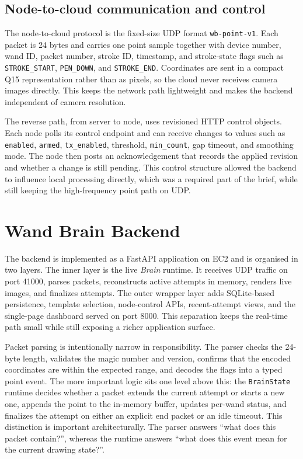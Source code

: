 \documentclass[10pt,a4paper]{article}
\begin{document}
\subsection*{Node-to-cloud communication and control}

The node-to-cloud protocol is the fixed-size UDP format
\texttt{wb-point-v1}. Each packet is 24 bytes and carries one point sample
together with device number, wand ID, packet number, stroke ID, timestamp, and
stroke-state flags such as \texttt{STROKE\_START}, \texttt{PEN\_DOWN}, and
\texttt{STROKE\_END}. Coordinates are sent in a compact Q15 representation
rather than as pixels, so the cloud never receives camera images directly. This
keeps the network path lightweight and makes the backend independent of camera
resolution.

The reverse path, from server to node, uses revisioned HTTP control objects.
Each node polls its control endpoint and can receive changes to values such as
\texttt{enabled}, \texttt{armed}, \texttt{tx\_enabled}, threshold,
\texttt{min\_count}, gap timeout, and smoothing mode. The node then posts an
acknowledgement that records the applied revision and whether a change is still
pending. This control structure allowed the backend to influence local
processing directly, which was a required part of the brief, while still
keeping the high-frequency point path on UDP.

\section{Wand Brain Backend}

The backend is implemented as a FastAPI application on EC2 and is organised in
two layers. The inner layer is the live \emph{Brain} runtime. It receives UDP
traffic on port 41000, parses packets, reconstructs active attempts in memory,
renders live images, and finalizes attempts. The outer wrapper layer adds
SQLite-based persistence, template selection, node-control APIs, recent-attempt
views, and the single-page dashboard served on port 8000. This separation keeps
the real-time path small while still exposing a richer application surface.

Packet parsing is intentionally narrow in responsibility. The parser checks the
24-byte length, validates the magic number and version, confirms that the
encoded coordinates are within the expected range, and decodes the flags into a
typed point event. The more important logic sits one level above this: the
\texttt{BrainState} runtime decides whether a packet extends the current attempt
or starts a new one, appends the point to the in-memory buffer, updates per-wand
status, and finalizes the attempt on either an explicit end packet or an idle
timeout. This distinction is important architecturally. The parser answers
``what does this packet contain?'', whereas the runtime answers ``what does this
event mean for the current drawing state?''.
\end{document}
